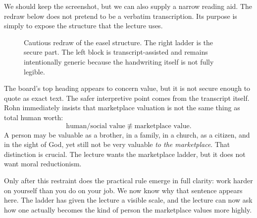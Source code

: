 We should keep the screenshot, but we can also supply a narrow reading aid. The redraw below does not pretend to be a verbatim transcription. Its purpose is simply to expose the structure that the lecture uses.

\begin{figure}[t]
\centering
{}
\caption{Cautious redraw of the easel structure. The right ladder is the secure part. The left block is transcript-assisted and remains intentionally generic because the handwriting itself is not fully legible.}
\end{figure}

The board's top heading appears to concern value, but it is not secure enough to quote as exact text. The safer interpretive point comes from the transcript itself. Rohn immediately insists that marketplace valuation is not the same thing as total human worth:
\begin{equation}
\text{human/social value} \not\equiv \text{marketplace value}.
\end{equation}
A person may be valuable as a brother, in a family, in a church, as a citizen, and in the sight of God, yet still not be very valuable \emph{to the marketplace}. That distinction is crucial. The lecture wants the marketplace ladder, but it does not want moral reductionism.

Only after this restraint does the practical rule emerge in full clarity: work harder on yourself than you do on your job. We now know why that sentence appears here. The ladder has given the lecture a visible scale, and the lecture can now ask how one actually becomes the kind of person the marketplace values more highly.

